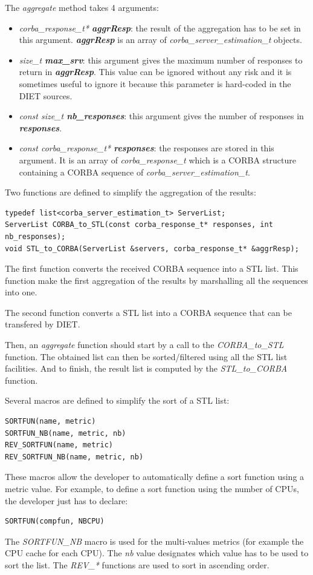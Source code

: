 \noindent The \textit{aggregate} method takes 4 arguments:
\begin{itemize}
  \item \textit{corba\_response\_t* \bf aggrResp}: the result of the aggregation
    has to be set in this argument. \textit{\bf aggrResp} is an array of
    \textit{corba\_server\_estimation\_t} objects. 
  \item \textit{size\_t \bf max\_srv}: this argument gives the maximum number
    of responses to return in \textit{\bf aggrResp}. This value can be ignored
    without any risk and it is sometimes useful to ignore it because this
    parameter is hard-coded in the DIET sources.
  \item \textit{const size\_t \bf nb\_responses}: this argument gives the number
    of responses in \textit{\bf responses}.
  \item \textit{const corba\_response\_t* \bf responses}: the responses are
    stored in this argument. It is an array of \textit{corba\_response\_t}
    which is a CORBA structure containing a CORBA sequence of
    \textit{corba\_server\_estimation\_t}.
\end{itemize}

\noindent Two functions are defined to simplify the aggregation of the results:
\begin{verbatim}
typedef list<corba_server_estimation_t> ServerList;
ServerList CORBA_to_STL(const corba_response_t* responses, int nb_responses);
void STL_to_CORBA(ServerList &servers, corba_response_t* &aggrResp);
\end{verbatim}
The first function converts the received CORBA sequence into a STL list. This
function make the first aggregation of the results by marshalling all the
sequences into one.

\noindent The second function converts a STL list into a CORBA sequence that
can be transfered by DIET.

Then, an \textit{aggregate} function should start by a call to the
\textit{CORBA\_to\_STL} function. The obtained list can then be sorted/filtered
using all the STL list facilities. And to finish, the result list is computed
by the \textit{STL\_to\_CORBA} function.

Several macros are defined to simplify the
sort of a STL list:
\begin{verbatim}
SORTFUN(name, metric)
SORTFUN_NB(name, metric, nb)
REV_SORTFUN(name, metric)
REV_SORTFUN_NB(name, metric, nb)
\end{verbatim}
These macros allow the developer to automatically define a sort function
using a metric value. For example, to define a sort function using the
number of CPUs, the developer just has to declare:
\begin{verbatim}
SORTFUN(compfun, NBCPU)
\end{verbatim}
The \textit{SORTFUN\_NB} macro is used for the multi-values metrics (for
example the CPU cache for each CPU). The \textit{nb} value designates which
value has to be used to sort the list.
The \textit{REV\_*} functions are used to sort in ascending order.

